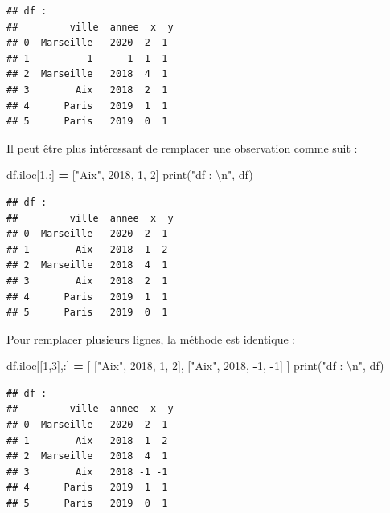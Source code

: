 \documentclass[
  12pt,
]{book}
\newenvironment{Shaded}{\begin{snugshade}}{\end{snugshade}}
\newcommand{\BuiltInTok}[1]{#1}
\newcommand{\CharTok}[1]{\textcolor[rgb]{0.31,0.60,0.02}{#1}}
\newcommand{\DecValTok}[1]{\textcolor[rgb]{0.00,0.00,0.81}{#1}}
\newcommand{\NormalTok}[1]{#1}
\newcommand{\OperatorTok}[1]{\textcolor[rgb]{0.81,0.36,0.00}{\textbf{#1}}}
\newcommand{\StringTok}[1]{\textcolor[rgb]{0.31,0.60,0.02}{#1}}
\numberwithin{equation}{section}
\numberwithin{countremarque}{section}
\begin{document}
\begin{lstlisting}
## df : 
##         ville  annee  x  y
## 0  Marseille   2020  2  1
## 1          1      1  1  1
## 2  Marseille   2018  4  1
## 3        Aix   2018  2  1
## 4      Paris   2019  1  1
## 5      Paris   2019  0  1
\end{lstlisting}

Il peut être plus intéressant de remplacer une observation comme suit :

\begin{Shaded}
\begin{Highlighting}[]
\NormalTok{df.iloc[}\DecValTok{1}\NormalTok{,:] }\OperatorTok{=}\NormalTok{ [}\StringTok{"Aix"}\NormalTok{, }\DecValTok{2018}\NormalTok{, }\DecValTok{1}\NormalTok{, }\DecValTok{2}\NormalTok{]}
\BuiltInTok{print}\NormalTok{(}\StringTok{"df : }\CharTok{\textbackslash{}n}\StringTok{"}\NormalTok{, df)}
\end{Highlighting}
\end{Shaded}

\begin{lstlisting}
## df : 
##         ville  annee  x  y
## 0  Marseille   2020  2  1
## 1        Aix   2018  1  2
## 2  Marseille   2018  4  1
## 3        Aix   2018  2  1
## 4      Paris   2019  1  1
## 5      Paris   2019  0  1
\end{lstlisting}

Pour remplacer plusieurs lignes, la méthode est identique :

\begin{Shaded}
\begin{Highlighting}[]
\NormalTok{df.iloc[[}\DecValTok{1}\NormalTok{,}\DecValTok{3}\NormalTok{],:] }\OperatorTok{=}\NormalTok{ [}
\NormalTok{    [}\StringTok{"Aix"}\NormalTok{, }\DecValTok{2018}\NormalTok{, }\DecValTok{1}\NormalTok{, }\DecValTok{2}\NormalTok{],}
\NormalTok{    [}\StringTok{"Aix"}\NormalTok{, }\DecValTok{2018}\NormalTok{, }\OperatorTok{{-}}\DecValTok{1}\NormalTok{, }\OperatorTok{{-}}\DecValTok{1}\NormalTok{]}
\NormalTok{]}
\BuiltInTok{print}\NormalTok{(}\StringTok{"df : }\CharTok{\textbackslash{}n}\StringTok{"}\NormalTok{, df)}
\end{Highlighting}
\end{Shaded}

\begin{lstlisting}
## df : 
##         ville  annee  x  y
## 0  Marseille   2020  2  1
## 1        Aix   2018  1  2
## 2  Marseille   2018  4  1
## 3        Aix   2018 -1 -1
## 4      Paris   2019  1  1
## 5      Paris   2019  0  1
\end{lstlisting}
\end{document}
